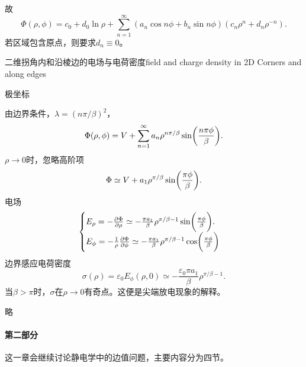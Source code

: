 故
\begin{equation}
    \Phi(\rho,\phi)=c_0+d_0\ln\rho+\sum_{n=1}^{\infty}(a_n\cos n\phi+b_n\sin n\phi)(c_n\rho^n+d_n\rho^{-n}).
\end{equation}
若区域包含原点，则要求$d_n\equiv 0$。
\begin{example}{二维拐角内和沿棱边的电场与电荷密度}{field and charge density in 2D Corners and along edges}
    \begin{center}
        \tikzchap 极坐标
    \end{center}
    由边界条件，$\lambda=(n\pi/\beta)^2$，
    \begin{equation}
        \Phi(\rho,\phi)=V+\sum_{n=1}^\infty a_n\rho^{n\pi/\beta}\sin\biggl(\frac{n\pi\phi}\beta\biggr).
    \end{equation}
    $\rho\to0$时，忽略高阶项
    \[
        \Phi\simeq V+a_1\rho^{\pi/\beta}\sin\biggl(\frac{\pi\phi}\beta\biggr).
    \]
    电场 
    \begin{equation}
        \begin{cases}
            E_\rho=-\pv\Phi\rho\simeq-\frac{\pi a_1}\beta\rho^{\pi/\beta-1}\sin\biggkh{\frac{\pi\phi}\beta}.\\
            E_\phi=-\frac1\rho\pv\Phi\phi\simeq-\frac{\pi a_1}\beta\rho^{\pi/\beta-1}\cos\biggkh{\frac{\pi\phi}\beta}
        \end{cases}
    \end{equation}
    边界感应电荷密度
    \begin{equation}
        \sigma(\rho)=\varepsilon_0E_\phi(\rho,0)\simeq-\frac{\varepsilon_0\pi a_1}\beta\rho^{\pi/\beta-1}.
    \end{equation}
    当$\beta>\pi$时，$\sigma$在$\rho\to0$有奇点。这便是尖端放电现象的解释。
\end{example}
略
\paragraph{第二部分}
这一章会继续讨论静电学中的边值问题，主要内容分为四节。

